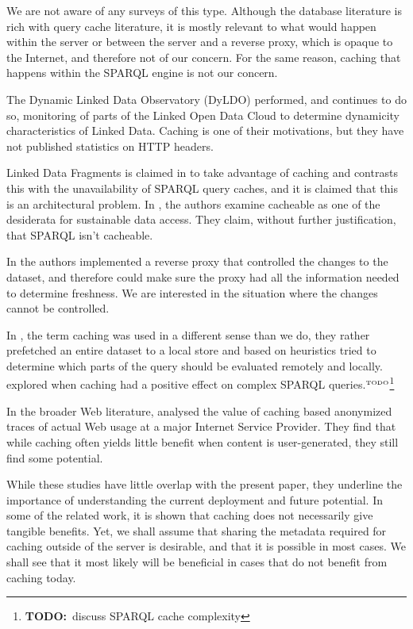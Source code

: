 \documentclass{llncs}
\newcommand{\todo}[1]{\ensuremath{^{\textrm{\tiny{TODO}\normalsize}}}\footnote{\textbf{TODO:}~#1}}
\begin{document}
We are not aware of any surveys of this type. Although the database
literature is rich with query cache literature, it is mostly relevant
to what would happen within the server or between the server and a
reverse proxy, which is opaque to the Internet, and therefore not of
our concern. For the same reason, caching that happens within the
SPARQL engine is not our concern.

The Dynamic Linked Data Observatory (DyLDO) \cite{dyldo2} performed,
and continues to do so, monitoring of parts of the Linked Open Data
Cloud to determine dynamicity characteristics of Linked Data. Caching
is one of their motivations, but they have not published statistics on
HTTP headers.

Linked Data Fragments is claimed in \cite{ldf1} to take advantage of
caching and contrasts this with the unavailability of SPARQL query
caches, and it is claimed that this is an architectural problem. In
\cite{hogan2014paths}, the authors examine cacheable as one of the
desiderata for sustainable data access. They claim, without further
justification, that SPARQL isn't cacheable. 

In \cite{sparqlproxy} the authors implemented a reverse proxy that
controlled the changes to the dataset, and therefore could make sure
the proxy had all the information needed to determine freshness. We
are interested in the situation where the changes cannot be
controlled.

In \cite{umbrich2012hybrid}, the term caching was used in a different
sense than we do, they rather prefetched an entire dataset to a local
store and based on heuristics tried to determine which parts of the
query should be evaluated remotely and locally. \cite{lampo2011cache}
explored when caching had a positive effect on complex SPARQL
queries.\todo{discuss SPARQL cache complexity}

In the broader Web literature, \cite{ager2010revisiting} analysed the
value of caching based anonymized traces of actual Web usage at a
major Internet Service Provider. They find that while caching often
yields little benefit when content is user-generated, they still find
some potential.

While these studies have little overlap with the present paper, they
underline the importance of understanding the current deployment and
future potential. In some of the related work, it is shown that
caching does not necessarily give tangible benefits. Yet, we shall
assume that sharing the metadata required for caching outside of the
server is desirable, and that it is possible in most cases. We shall
see that it most likely will be beneficial in cases that do not
benefit from caching today.
\end{document}
